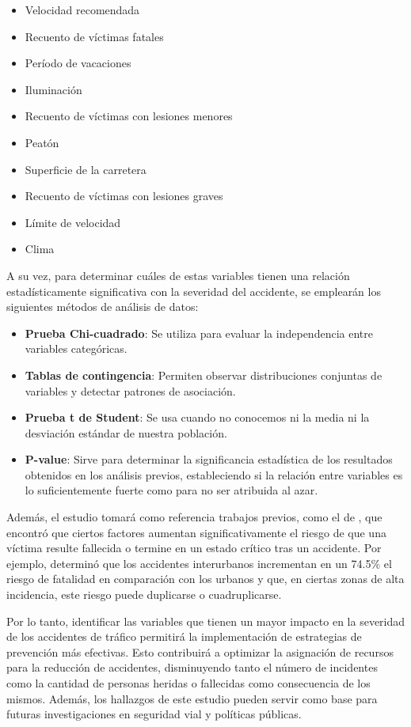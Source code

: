 \documentclass{book}
\begin{document}
\begin{itemize}
\item Velocidad recomendada
\item Recuento de víctimas fatales
\item Período de vacaciones
\item Iluminación
\item Recuento de víctimas con lesiones menores
\item Peatón
\item Superficie de la carretera
\item Recuento de víctimas con lesiones graves
\item Límite de velocidad
\item Clima
\end{itemize}

A su vez, para determinar cuáles de estas variables tienen una relación estadísticamente significativa con la severidad del accidente, se emplearán los siguientes métodos de análisis de datos:

\begin{itemize}
\item \textbf{Prueba Chi-cuadrado}: Se utiliza para evaluar la independencia entre variables categóricas.
\item \textbf{Tablas de contingencia}: Permiten observar distribuciones conjuntas de variables y detectar patrones de asociación.
\item \textbf{Prueba t de Student}: Se usa cuando no conocemos ni la media ni la desviación estándar de nuestra población.
\item \textbf{P-value}: Sirve para determinar la significancia estadística de los resultados obtenidos en los análisis previos, estableciendo si la relación entre variables es lo suficientemente fuerte como para no ser atribuida al azar.
\end{itemize}

Además, el estudio tomará como referencia trabajos previos, como el de \cite{BuitragoRamírezFrancisco2019Vpdv}, que encontró que ciertos factores aumentan significativamente el riesgo de que una víctima resulte fallecida o termine en un estado crítico tras un accidente. Por ejemplo, determinó que los accidentes interurbanos incrementan en un 74.5\% el riesgo de fatalidad en comparación con los urbanos y que, en ciertas zonas de alta incidencia, este riesgo puede duplicarse o cuadruplicarse.

Por lo tanto, identificar las variables que tienen un mayor impacto en la severidad de los accidentes de tráfico permitirá la implementación de estrategias de prevención más efectivas. Esto contribuirá a optimizar la asignación de recursos para la reducción de accidentes, disminuyendo tanto el número de incidentes como la cantidad de personas heridas o fallecidas como consecuencia de los mismos. Además, los hallazgos de este estudio pueden servir como base para futuras investigaciones en seguridad vial y políticas públicas.
\end{document}
